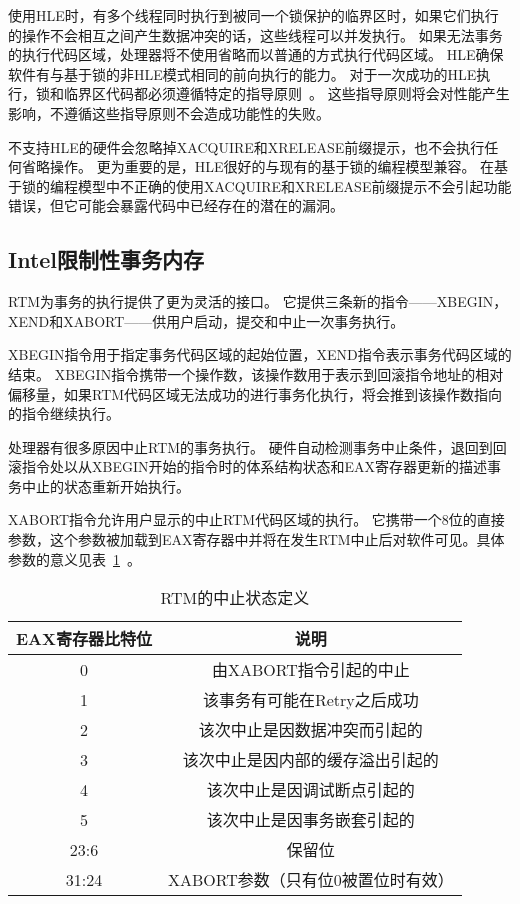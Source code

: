 使用HLE时，有多个线程同时执行到被同一个锁保护的临界区时，如果它们执行的操作不会相互之间产生数据冲突的话，这些线程可以并发执行。
如果无法事务的执行代码区域，处理器将不使用省略而以普通的方式执行代码区域。
HLE确保软件有与基于锁的非HLE模式相同的前向执行的能力。
对于一次成功的HLE执行，锁和临界区代码都必须遵循特定的指导原则~\cite{Intel2015Intel}。
这些指导原则将会对性能产生影响，不遵循这些指导原则不会造成功能性的失败。

不支持HLE的硬件会忽略掉XACQUIRE和XRELEASE前缀提示，也不会执行任何省略操作。
更为重要的是，HLE很好的与现有的基于锁的编程模型兼容。
在基于锁的编程模型中不正确的使用XACQUIRE和XRELEASE前缀提示不会引起功能错误，但它可能会暴露代码中已经存在的潜在的漏洞。

\subsection{Intel限制性事务内存}
RTM为事务的执行提供了更为灵活的接口。
它提供三条新的指令——XBEGIN， XEND和XABORT——供用户启动，提交和中止一次事务执行。

XBEGIN指令用于指定事务代码区域的起始位置，XEND指令表示事务代码区域的结束。
XBEGIN指令携带一个操作数，该操作数用于表示到回滚指令地址的相对偏移量，如果RTM代码区域无法成功的进行事务化执行，将会推到该操作数指向的指令继续执行。

处理器有很多原因中止RTM的事务执行。
硬件自动检测事务中止条件，退回到回滚指令处以从XBEGIN开始的指令时的体系结构状态和EAX寄存器更新的描述事务中止的状态重新开始执行。

XABORT指令允许用户显示的中止RTM代码区域的执行。
它携带一个8位的直接参数，这个参数被加载到EAX寄存器中并将在发生RTM中止后对软件可见。具体参数的意义见表~\ref{tab:rtm_status}~。

\begin{table}[htbp]
  \centering
  \caption{RTM的中止状态定义}
  \label{tab:rtm_status}
  \begin{tabular}{cc}
    \toprule
       EAX寄存器比特位 & 说明 \\
    \midrule
      0     & 由XABORT指令引起的中止 \\
      1     & 该事务有可能在Retry之后成功\\
      2     & 该次中止是因数据冲突而引起的 \\
      3     & 该次中止是因内部的缓存溢出引起的\\
      4     & 该次中止是因调试断点引起的 \\
      5     & 该次中止是因事务嵌套引起的 \\
      23:6  & 保留位\\
      31:24 & XABORT参数（只有位0被置位时有效） \\
    \bottomrule
  \end{tabular}
\end{table}


